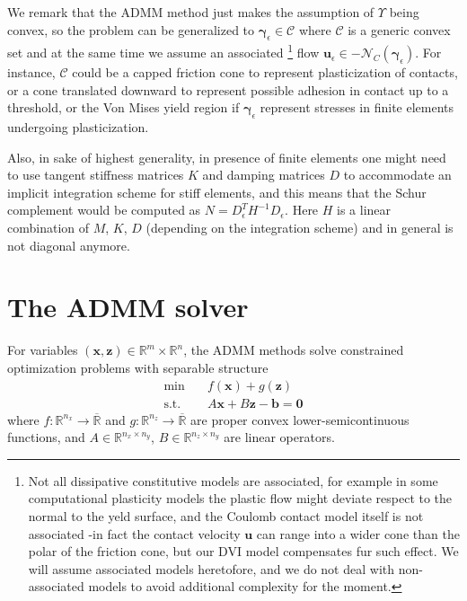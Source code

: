 \documentclass[final,3p]{elsarticle}
\newcommand{\vect}[1]{\bm{#1}}
\begin{document}

We remark that the ADMM method just makes the assumption of $\Upsilon$ being convex, so the problem can be generalized to $\vect{\gamma}_\epsilon \in \mathcal{C}$ where $\mathcal{C}$ is a generic convex set and at the same time we assume an associated 
 \footnote{Not all dissipative constitutive models are associated, for example in some computational plasticity models the plastic flow might deviate respect to the normal to the yeld surface, and the Coulomb contact model itself is not associated -in fact the contact velocity $\vect{u}$ can range into a wider cone than the polar of the friction cone, but our DVI model compensates fur such effect. We will assume associated models heretofore, and we do not deal with non-associated models to avoid additional complexity for the moment.} 
flow $\vect{u}_\epsilon \in - \mathcal{N}_{C}(\vect{\gamma}_\epsilon)$. For instance, $\mathcal{C}$ could be a capped friction cone to represent plasticization of contacts, or a cone translated downward to represent possible adhesion in contact up to a threshold, or the Von Mises yield region if $\vect{\gamma}_\epsilon$ represent stresses in finite elements undergoing plasticization. 

Also, in sake of highest generality, in presence of finite elements one might need to use tangent stiffness matrices $K$ and damping matrices $D$ to accommodate an implicit integration scheme for stiff elements, and this means that the Schur complement would be computed as $N=D_{\epsilon}^T H^{-1} D_{\epsilon}$. Here $H$ is a linear combination of $M$, $K$, $D$ (depending on the integration scheme) and in general is not diagonal anymore. 




\section{The ADMM solver}




For variables $(\vect{x},\vect{z}) \in \mathbb{R}^m \times \mathbb{R}^n$, the ADMM methods solve constrained optimization problems with separable structure
\begin{subequations}
	\begin{align}
    \text{min} \quad  & f(\vect{x}) + g(\vect{z}) \\
	  \text{s.t.} \quad &  A \vect{x} + B \vect{z} - \vect{b} = \vect{0}
	\end{align}
	\label{eq:admm}
\end{subequations}
where $f : \mathbb{R}^{n_x}\rightarrow\overline{\mathbb{R}}$ and  $g : \mathbb{R}^{n_z}\rightarrow\overline{\mathbb{R}}$ are proper convex lower-semicontinuous functions,
and $A \in \mathbb{R}^{n_x \times n_y}$, $B \in \mathbb{R}^{n_z \times n_y}$ are linear operators.
\end{document}
